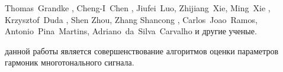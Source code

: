 Thomas~Grandke \cite{4315077},
Cheng-I~Chen \cite{chen2013comparative},
Jiufei~Luo, Zhijiang~Xie, Ming~Xie \cite{luo2015phase, luo2016interpolated},
Krzysztof~Duda \cite{duda2011dft},
Shen Zhou, Zhang Shancong \cite{zhou2018improved},
Carlos~Joao~Ramos, Antonio~Pina~Martins, Adriano~da~Silva~Carvalho \cite{ramos2017power, ramos2005synchronizing, 7065248} и другие ученые.

{\aim} данной работы является совершенствование алгоритмов оценки параметров гармоник многотонального сигнала.



